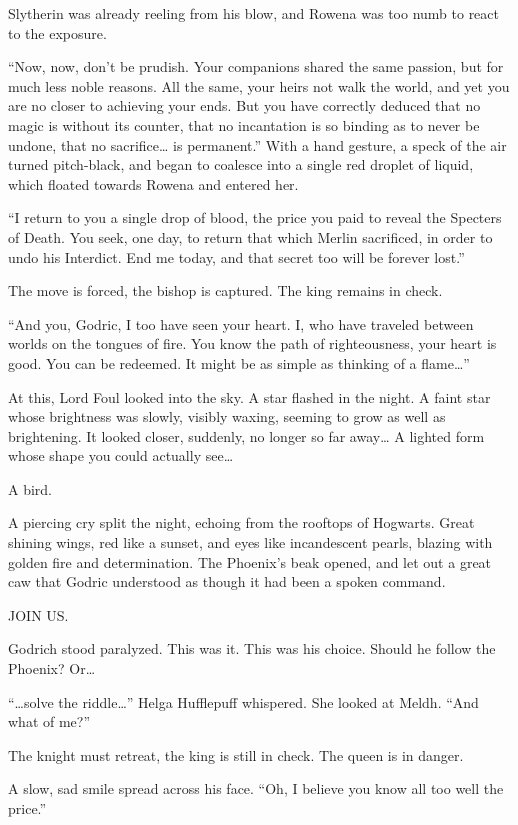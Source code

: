 Slytherin was already reeling from his blow, and Rowena was too numb to react to the exposure.

“Now, now, don’t be prudish. Your companions shared the same passion, but for much less noble reasons. All the same, your heirs not walk the world, and yet you are no closer to achieving your ends. But you have correctly deduced that no magic is without its counter, that no incantation is so binding as to never be undone, that no sacrifice… is permanent.” With a hand gesture, a speck of the air turned pitch-black, and began to coalesce into a single red droplet of liquid, which floated towards Rowena and entered her.

“I return to you a single drop of blood, the price you paid to reveal the Specters of Death. You seek, one day, to return that which Merlin sacrificed, in order to undo his Interdict. End me today, and that secret too will be forever lost.”

The move is forced, the bishop is captured. The king remains in check.

“And you, Godric, I too have seen your heart. I, who have traveled between worlds on the tongues of fire. You know the path of righteousness, your heart is good. You can be redeemed. It might be as simple as thinking of a flame…”

At this, Lord Foul looked into the sky. A star flashed in the night. A faint star whose brightness was slowly, visibly waxing, seeming to grow as well as brightening. It looked closer, suddenly, no longer so far away… A lighted form whose shape you could actually see…

A bird.

A piercing cry split the night, echoing from the rooftops of Hogwarts. Great shining wings, red like a sunset, and eyes like incandescent pearls, blazing with golden fire and determination. The Phoenix’s beak opened, and let out a great caw that Godric understood as though it had been a spoken command.

JOIN US.

Godrich stood paralyzed. This was it. This was his choice. Should he follow the Phoenix? Or…

“…solve the riddle…” Helga Hufflepuff whispered. She looked at Meldh. “And what of me?”

The knight must retreat, the king is still in check. The queen is in danger.

A slow, sad smile spread across his face. “Oh, I believe you know all too well the price.”

